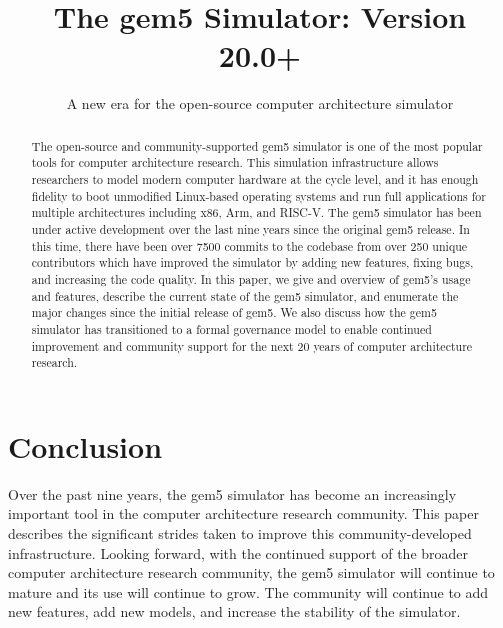 \documentclass[acmlarge,nonacm,screen=true]{acmart}
\begin{document}
\title{The gem5 Simulator: Version 20.0+}
\subtitle{A new era for the open-source computer architecture simulator}
% 


\begin{abstract}
    The open-source and community-supported gem5 simulator is one of the most popular tools for computer architecture research.
    This simulation infrastructure allows researchers to model modern computer hardware at the cycle level, and it has enough fidelity to boot unmodified Linux-based operating systems and run full applications for multiple architectures including x86, Arm\textregistered, and RISC-V.
    The gem5 simulator has been under active development over the last nine years since the original gem5 release.
    In this time, there have been over 7500 commits to the codebase from over 250 unique contributors which have improved the simulator by adding new features, fixing bugs, and increasing the code quality.
    In this paper, we give and overview of gem5's usage and features, describe the current state of the gem5 simulator, and enumerate the major changes since the initial release of gem5.
    We also discuss how the gem5 simulator has transitioned to a formal governance model to enable continued improvement and community support for the next 20 years of computer architecture research.
\end{abstract}

\maketitle
\renewcommand{\shortauthors}{Lowe-Power and the gem5 Community}





\section{Conclusion}

Over the past nine years, the gem5 simulator has become an increasingly important tool in the computer architecture research community.
This paper describes the significant strides taken to improve this community-developed infrastructure.
Looking forward, with the continued support of the broader computer architecture research community, the gem5 simulator will continue to mature and its use will continue to grow.
The community will continue to add new features, add new models, and increase the stability of the simulator.
\end{document}
